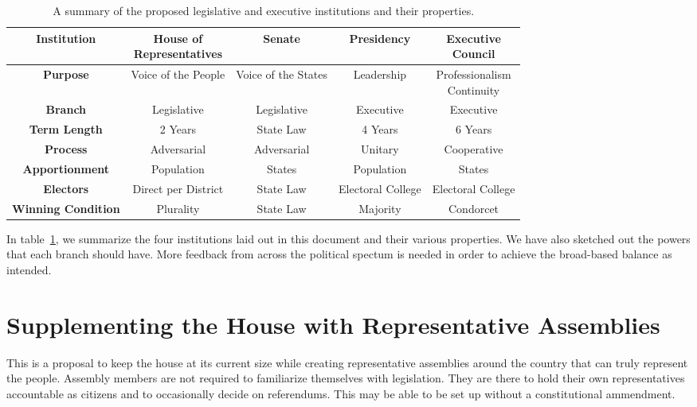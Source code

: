 \documentclass{article}
\begin{document}
\begin{table}[ht]
\centering
\renewcommand{\arraystretch}{1.5}
\begin{tabular}{|c|c|c|c|c|}
\hline
\textbf{Institution} & \makecell{House of \\ Representatives} & Senate & Presidency & \makecell{Executive \\ Council}  \\
\hline
\textbf{Purpose} & Voice of the People & Voice of the States & Leadership & \makecell{Professionalism \\ Continuity} \\
\hline
\textbf{Branch} & Legislative & Legislative & Executive & Executive \\
\hline
\textbf{Term Length} & 2 Years & State Law & 4 Years & 6 Years \\
\hline
\textbf{Process} & Adversarial & Adversarial & Unitary & Cooperative \\
\hline
\textbf{Apportionment} & Population & States & Population & States  \\
\hline
\textbf{Electors} & Direct per District & State Law  & Electoral College & Electoral College  \\
\hline
\textbf{Winning Condition} & Plurality & State Law & Majority & Condorcet  \\
\hline
\end{tabular}
\caption{A summary of the proposed legislative and executive institutions and their properties. }
\label{table:institutions}
\end{table}

In table~\ref{table:institutions}, we summarize the four institutions laid out in this document and their various properties. We have also sketched out the powers that each branch should have. More feedback from across the political spectum is needed in order to achieve the broad-based balance as intended.

\appendix
\section{Supplementing the House with Representative Assemblies}
\label{appendix:house}

This is a proposal to keep the house at its current size while creating representative assemblies around the country that can truly represent the people. Assembly members are not required to familiarize themselves with legislation. They are there to hold their own representatives accountable as citizens and to occasionally decide on referendums. This may be able to be set up without a constitutional ammendment.
\end{document}

